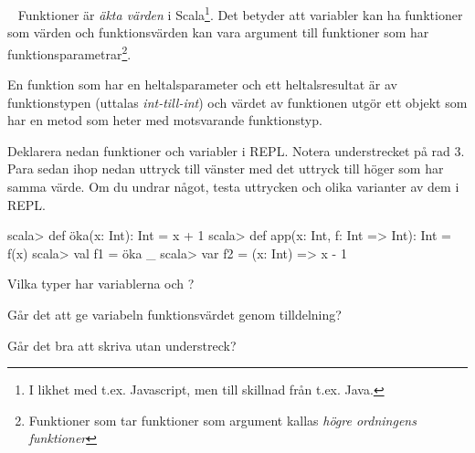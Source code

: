 \begin{ConceptConnections}

\end{ConceptConnections}

\SOLUTION

\TaskSolved \what

\begin{ConceptConnections}
  
\end{ConceptConnections}

\QUESTEND




\QUESTBEGIN

\Task  \what~  Funktioner är \emph{äkta värden} i Scala\footnote{I likhet med t.ex. Javascript, men till skillnad från t.ex. Java.}. Det betyder att variabler kan ha funktioner som värden och funktionsvärden kan vara argument till funktioner som har funktionsparametrar\footnote{Funktioner som tar funktioner som argument kallas \emph{högre ordningens funktioner}}.

  En funktion som har en heltalsparameter och ett heltalsresultat är av funktionstypen  (uttalas \emph{int-till-int}) och värdet av funktionen utgör ett objekt som har en metod som heter  med motsvarande funktionstyp.

\Subtask \label{subtask:funcval} Deklarera nedan funktioner och variabler i REPL. Notera understrecket på rad 3. Para sedan ihop nedan uttryck till vänster med det uttryck till höger som har samma värde. Om du undrar något, testa uttrycken och olika varianter av dem i REPL.

\begin{REPL}
scala> def öka(x: Int): Int = x + 1
scala> def app(x: Int, f: Int => Int): Int = f(x)
scala> val f1 = öka _
scala> var f2 = (x: Int) => x - 1
\end{REPL}

\begin{ConceptConnections}

\end{ConceptConnections}


\Subtask Vilka typer har variablerna  och ?

\Subtask Går det att ge variabeln  funktionsvärdet  genom tilldelning?

\Subtask Går det bra att skriva  utan understreck?

